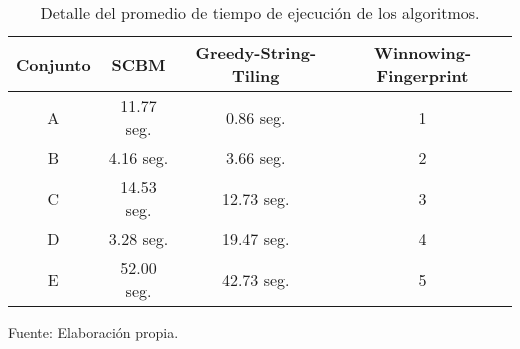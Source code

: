 \begin{table}[H]
\centering
\begin{tabular}{|c||c||c||c|}
\hline
Conjunto & SCBM & Greedy-String-Tiling & Winnowing-Fingerprint \\ \hline
A & 11.77 seg.  & 0.86 seg. &1  \\ \hline
B & 4.16 seg.  & 3.66 seg. &2 \\ \hline
C & 14.53 seg.  & 12.73 seg. &3  \\ \hline
D & 3.28 seg.  & 19.47 seg. &4 \\ \hline
E & 52.00 seg.  & 42.73 seg. &5 \\ \hline
\end{tabular}
\caption{Detalle del promedio de tiempo de ejecución de los algoritmos.}
Fuente: Elaboración propia.
\label{pruebaTiempo}
\end{table}
